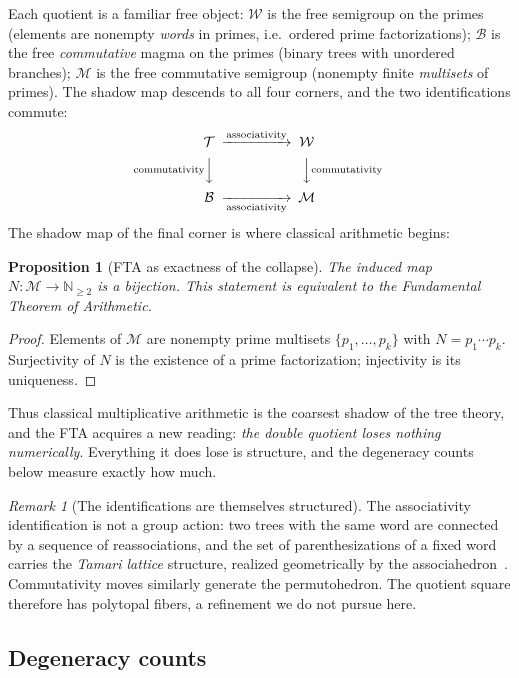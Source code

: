 \documentclass[11pt]{article}
\newcommand{\cT}{\mathcal{T}}   %
\newcommand{\cW}{\mathcal{W}}   %
\newcommand{\cB}{\mathcal{B}}   %
\newcommand{\cM}{\mathcal{M}}   %
\newcommand{\NN}{\mathbb{N}}
\numberwithin{equation}{section}
\theoremstyle{plain}
\newtheorem{proposition}[theorem]{Proposition}
\theoremstyle{definition}
\theoremstyle{remark}
\newtheorem{remark}[theorem]{Remark}
\begin{document}
Each quotient is a familiar free object: $\cW$ is the free semigroup on the primes
(elements are nonempty \emph{words} in primes, i.e.\ ordered prime factorizations);
$\cB$ is the free \emph{commutative} magma on the primes (binary trees with unordered
branches); $\cM$ is the free commutative semigroup (nonempty finite \emph{multisets} of
primes). The shadow map descends to all four corners, and the two identifications
commute:
\[
\begin{CD}
\cT @>\text{associativity}>> \cW \\
@V\text{commutativity}VV @VV\text{commutativity}V \\
\cB @>>\text{associativity}> \cM
\end{CD}
\]
The shadow map of the final corner is where classical arithmetic begins:

\begin{proposition}[FTA as exactness of the collapse]\label{prop:fta}
The induced map $N \colon \cM \to \NN_{\ge2}$ is a bijection. This statement is
equivalent to the Fundamental Theorem of Arithmetic.
\end{proposition}

\begin{proof}
Elements of $\cM$ are nonempty prime multisets $\{p_1,\dots,p_k\}$ with
$N = p_1\cdots p_k$. Surjectivity of $N$ is the existence of a prime factorization;
injectivity is its uniqueness. \end{proof}

Thus classical multiplicative arithmetic is the coarsest shadow of the tree theory, and
the FTA acquires a new reading: \emph{the double quotient loses nothing numerically}.
Everything it does lose is structure, and the degeneracy counts below measure exactly
how much.

\begin{remark}[The identifications are themselves structured]
The associativity identification is not a group action: two trees with the same word are
connected by a sequence of reassociations, and the set of parenthesizations of a fixed
word carries the \emph{Tamari lattice} structure, realized geometrically by the
associahedron~\cite{tamari}. Commutativity moves similarly generate the permutohedron.
The quotient square therefore has polytopal fibers, a refinement we do not pursue here.
\end{remark}

\subsection{Degeneracy counts}
\end{document}
